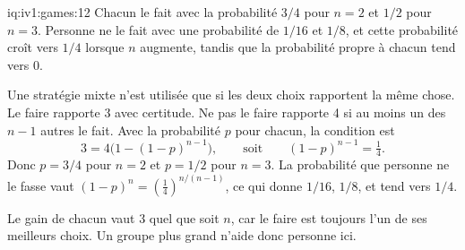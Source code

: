 \begin{solution}{iq:iv1:games:12}
Chacun le fait avec la probabilité $3/4$ pour $n = 2$ et $1/2$ pour $n = 3$. Personne ne le fait avec une probabilité de $1/16$ et $1/8$, et cette probabilité croît vers $1/4$ lorsque $n$ augmente, tandis que la probabilité propre à chacun tend vers 0.

Une stratégie mixte n'est utilisée que si les deux choix rapportent la même chose. Le faire rapporte 3 avec certitude. Ne pas le faire rapporte 4 si au moins un des $n - 1$ autres le fait. Avec la probabilité $p$ pour chacun, la condition est
\[
3 = 4\bigl(1 - (1 - p)^{n - 1}\bigr), \qquad\text{soit}\qquad (1 - p)^{n - 1} = \tfrac14.
\]
Donc $p = 3/4$ pour $n = 2$ et $p = 1/2$ pour $n = 3$. La probabilité que personne ne le fasse vaut $(1 - p)^n = (\tfrac14)^{n/(n - 1)}$, ce qui donne $1/16$, $1/8$, et tend vers $1/4$.

Le gain de chacun vaut 3 quel que soit $n$, car le faire est toujours l'un de ses meilleurs choix. Un groupe plus grand n'aide donc personne ici.

\end{solution}

